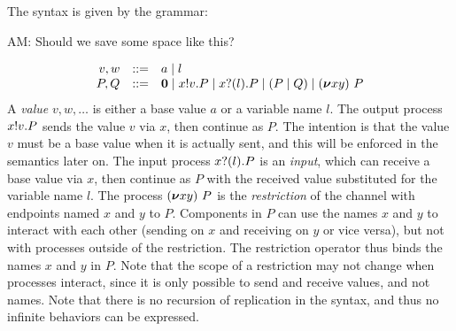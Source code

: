 The syntax is
given by the grammar:
\begin{metanote}
AM:  Should we save some space like this?
\end{metanote}
\[
\begin{array}{rcl}
  v,w & ::= & a \mid l \\
   P,Q & ::=& \bm{0} \mid x ! v . P \mid x ? (l) . P \mid (P \mid Q) \mid  (\bm{\nu} xy)~P
\end{array}
\]
A \emph{value} \( v, w, \dots \) is either a base value \( a \) or a variable name \( l \).
The output process \( x ! v . P \) sends the value \( v \) via \( x \), then continue as \( P \).
The intention is that the value \( v \) must be a base value when it is actually sent, and this will be enforced in the semantics later on.
The input process \( x ? (l) . P \) is an \emph{input}, which can receive a base value via \( x \), then continue as \( P \) with the received value substituted for the variable name \( l \).
The process \( (\bm{\nu} xy)~P \) is the \emph{restriction} of the channel with endpoints named \( x \) and \( y \) to \( P \).
Components in \( P \) can use the names \( x \) and \( y \) to interact with each other (sending on \( x \) and receiving on \( y \) or vice versa), but not with processes outside of the restriction.
The restriction operator thus binds the names \( x \) and \( y \) in \( P \).
Note that the scope of a restriction may not change when processes interact, since it is only possible to send and receive values, and not names.
Note that there is no recursion of replication in the syntax, and thus no infinite behaviors can be expressed.

